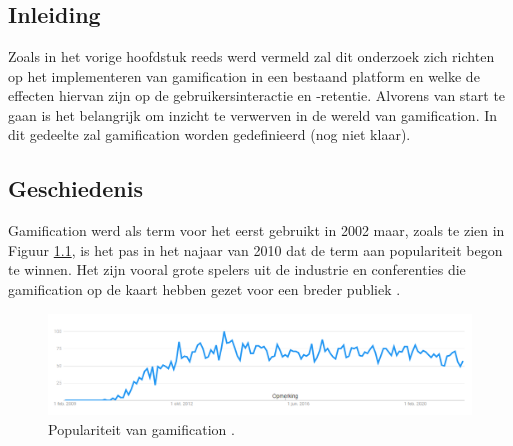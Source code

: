 \chapter{}
\label{ch:stand-van-zaken}



\section{Inleiding}

Zoals in het vorige hoofdstuk reeds werd vermeld zal dit onderzoek zich richten op het implementeren van gamification in een bestaand platform en welke de effecten hiervan zijn op de gebruikersinteractie en -retentie. Alvorens van start te gaan is het belangrijk om inzicht te verwerven in de wereld van gamification. In dit gedeelte zal gamification worden gedefinieerd (nog niet klaar).

\section{Geschiedenis}

Gamification werd als term voor het eerst gebruikt in 2002 \autocite{Pelling2011} maar, zoals te zien in Figuur \ref{fig:googletrends}, is het pas in het najaar van 2010 dat de term aan populariteit begon te winnen. Het zijn vooral grote spelers uit de industrie en conferenties die gamification op de kaart hebben gezet voor een breder publiek \autocite{Deterding20112}.

\begin{figure}
    \includegraphics[width=\linewidth]{GoogleTrends.png}
    \caption{Populariteit van gamification \autocite{GoogleTrends2021}.}
    \label{fig:googletrends}
\end{figure}

